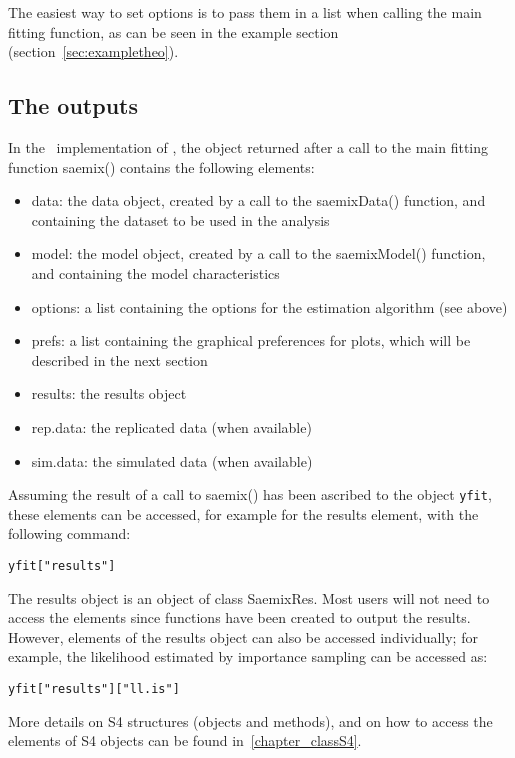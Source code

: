 The easiest way to set options is to pass them in a list when calling the main fitting function, as can be seen in the example section (section~\ref{sec:exampletheo}).

\clearpage
\subsection{The outputs}

In the \R~implementation of \monolix, the object returned after a call to the main fitting function {\sf saemix()} contains the following elements:
\begin{itemize}
\item data: the data object, created by a call to the {\sf saemixData()} function, and containing the dataset to be used in the analysis
\item model: the model object, created by a call to the {\sf saemixModel()} function, and containing the model characteristics
\item options: a list containing the options for the estimation algorithm (see above)
\item prefs: a list containing the graphical preferences for plots, which will be described in the next section
\item results: the results object
\item rep.data: the replicated data (when available)
\item sim.data: the simulated data (when available)
\end{itemize}
Assuming the result of a call to {\sf saemix()} has been ascribed to the object \verb+yfit+, these elements can be accessed, for example for the results element, with the following command:
\begin{verbatim}
yfit["results"]
\end{verbatim}
The results object is an object of class {\sf SaemixRes}. Most users will not need to access the elements since functions have been created to output the results. However, elements of the results object can also be accessed individually; for example, the likelihood estimated by importance sampling can be accessed as:
\begin{verbatim}
yfit["results"]["ll.is"]
\end{verbatim}
More details on S4 structures (objects and methods), and on how to access the elements of S4 objects can be found in~\ref{chapter_classS4}.

